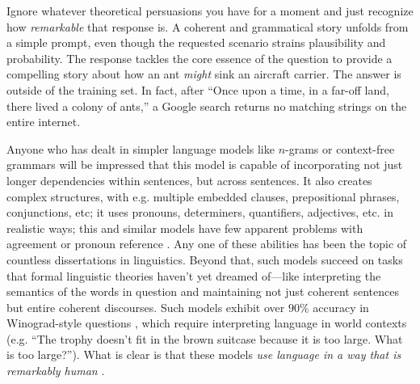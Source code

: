 \documentclass[output=paper,colorlinks,citecolor=brown
]{langscibook}
\begin{document}
\noindent Ignore whatever theoretical persuasions you have for a moment and just recognize how \emph{remarkable} that response is. A coherent and grammatical story unfolds from a simple prompt, even though the requested scenario strains plausibility and probability. The response tackles the core essence of the question to provide a compelling story about how an ant \emph{might} sink an aircraft carrier. The answer is outside of the training set. In fact, after ``Once upon a time, in a far-off land, there lived a colony of ants,'' a Google search returns no matching strings on the entire internet.

Anyone who has dealt in simpler language models like $n$-grams or context-free grammars will be impressed that this model is capable of incorporating not just longer dependencies within sentences, but across sentences. It also creates complex structures, with e.g. multiple embedded clauses, prepositional phrases, conjunctions, etc; it uses pronouns, determiners, quantifiers, adjectives, etc. in realistic ways; this and similar models have few apparent problems with agreement or pronoun reference \citep{gulordava2018colorless,goldberg2019assessing}. Any one of these abilities has been the topic of countless dissertations in linguistics. Beyond that, such models succeed on tasks that formal linguistic theories haven't yet dreamed of---like interpreting the semantics of the words in question and maintaining not just coherent sentences but entire coherent discourses. Such models exhibit over $90\%$ accuracy in Winograd-style questions \citep{kocijan2020review,kocijan2022defeat}, which require interpreting language in world contexts (e.g. ``The trophy doesn’t fit in the brown suitcase because it is too large. What is too large?''). What is clear is that these models \emph{use language in a way that is remarkably human} \citep{mahowald2023dissociating}. 


\end{document}
